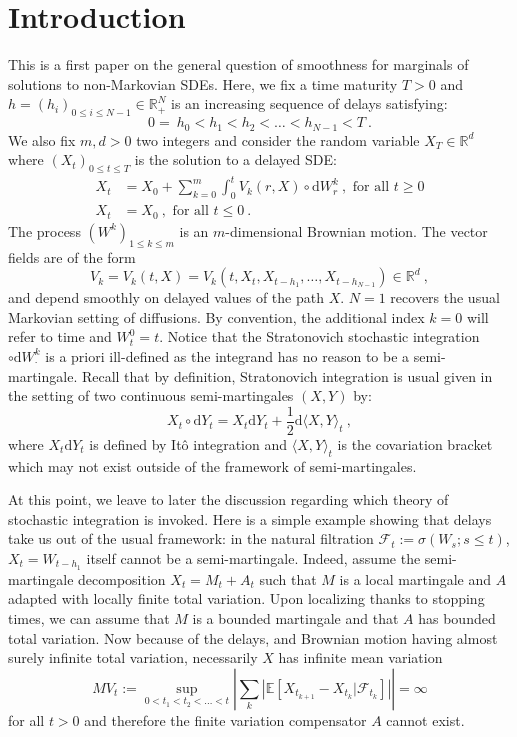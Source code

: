 \documentclass[11pt]{article}
\theoremstyle{definition}
\numberwithin{equation}{section}
\numberwithin{figure}{section}
\numberwithin{table}{section}
\newcommand*\half{\frac{1}{2}}
\newcommand*\R{\mathbb{R}}
\newcommand*\E{\mathbb{E}}
\newcommand*\Fc{\mathcal{F}}
\newcommand*{\dd}{\mathrm{d}}
\newcommand*{\dW}{\dd W}
\newcommand*{\dY}{\dd Y}
\begin{document}
\section{Introduction}

This is a first paper on the general question of smoothness for marginals of solutions to non-Markovian SDEs. Here, we fix a time maturity $T>0$ and $h = \left(h_i \right)_{0 \leq i \leq N-1} \in \R_+^N$ is an increasing sequence of delays satisfying:
\begin{equation}\label{eq:delays}
0 = \ h_0 < h_1 < h_2 < \dots < h_{N-1} < T \ .
\end{equation}
We also fix $m,d>0$ two integers and consider the random variable $X_T \in \R^d$ where $\left(X_t \right)_{0 \leq t \leq T}$ is the solution to a delayed SDE:
\begin{align}\label{eq:sde_def}
X_t & = X_0 + \sum_{k=0}^m \int_0^t V_k(r,X) \circ \dW^k_r \ , \text{ for all }t\geq 0\\
X_t & = X_0 \ ,\text{ for all }t\leq 0 \ .
\end{align}
The process $(W^k)_{1\leq k\leq m}$ is an $m$-dimensional Brownian motion. The vector fields are of the form
\[
V_k = V_k(t,X) = V_k\left(t, X_{t},X_{t-h_1},\dots, X_{t-h_{N-1}} \right) \in \R^d \ ,
\]
and depend smoothly on delayed values of the path $X$. $N=1$ recovers the usual Markovian setting of diffusions. By convention, the additional index $k=0$ will refer to time and $W_t^0=t$. Notice that the Stratonovich stochastic integration $\circ \dW^k_\cdot$ is a priori ill-defined as the integrand has no reason to be a semi-martingale. Recall that by definition, Stratonovich integration is usual given in the setting of two continuous semi-martingales $(X,Y)$ by:
\[
X_t \circ \dY_t = X_t \dY_t + \half \dd \langle X, Y \rangle_t \ ,
\]
where $X_t \dY_t$ is defined by Itô integration and $\langle X, Y \rangle_t$ is the covariation bracket which may not exist outside of the framework of semi-martingales.

At this point, we leave to later the discussion regarding which theory of stochastic integration is invoked. Here is a simple example showing that delays take us out of the usual framework: in the natural filtration $\Fc_t := \sigma\left(W_s ; s \leq t \right)$, $X_t = W_{t-h_1}$ itself cannot be a semi-martingale. Indeed, assume the semi-martingale decomposition $X_t = M_t + A_t$ such that $M$ is a local martingale and $A$ adapted with locally finite total variation. Upon localizing thanks to stopping times, we can assume that $M$ is a bounded martingale and that $A$ has bounded total variation. Now because of the delays, and Brownian motion having almost surely infinite total variation, necessarily $X$ has infinite mean variation
\[
MV_t := \sup_{0 < t_1 < t_2 < \dots < t}
\left| \sum_k \left|\E \left[X_{t_{k+1}} - X_{t_{k}}| \Fc_{t_k} \right]\right| \right|
= \infty
\]
for all $t>0$ and therefore the finite variation compensator $A$ cannot exist.
\end{document}
